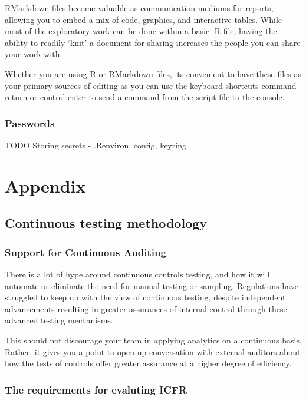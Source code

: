 \documentclass[
]{book}
\begin{document}
RMarkdown files become valuable as communication mediums for reports, allowing you to embed a mix of code, graphics, and interactive tables. While most of the exploratory work can be done within a basic .R file, having the ability to readily `knit' a document for sharing increases the people you can share your work with.

Whether you are using R or RMarkdown files, its convenient to have these files as your primary sources of editing as you can use the keyboard shortcuts command-return or control-enter to send a command from the script file to the console.

\hypertarget{passwords}{%
\section{Passwords}\label{passwords}}

TODO Storing secrets - .Renviron, config, keyring

\hypertarget{part-appendix}{%
\part{Appendix}\label{part-appendix}}

\hypertarget{appendixct}{%
\chapter{Continuous testing methodology}\label{appendixct}}

\hypertarget{support-for-continuous-auditing}{%
\section{Support for Continuous Auditing}\label{support-for-continuous-auditing}}

There is a lot of hype around continuous controls testing, and how it will automate or eliminate the need for manual testing or sampling. Regulations have struggled to keep up with the view of continuous testing, despite independent advancements resulting in greater assurances of internal control through these advanced testing mechanisms.

This should not discourage your team in applying analytics on a continuous basis. Rather, it gives you a point to open up conversation with external auditors about how the tests of controls offer greater assurance at a higher degree of efficiency.

\hypertarget{the-requirements-for-evaluting-icfr}{%
\section{The requirements for evaluting ICFR}\label{the-requirements-for-evaluting-icfr}}
\end{document}
